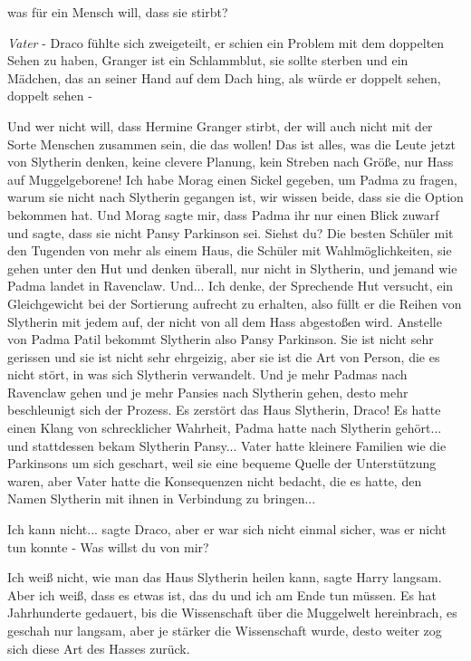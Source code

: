 \glqq was für ein Mensch will, dass sie stirbt?\grqq{}

\emph{Vater} - Draco fühlte sich zweigeteilt, er schien ein Problem mit dem
doppelten Sehen zu haben, Granger ist ein Schlammblut, sie sollte sterben und
ein Mädchen, das an seiner Hand auf dem Dach hing, als würde er doppelt sehen,
doppelt sehen -

\glqq Und wer nicht will, dass Hermine Granger stirbt, der will auch nicht mit
der Sorte Menschen zusammen sein, die das wollen! Das ist alles, was die Leute
jetzt von Slytherin denken, keine clevere Planung, kein Streben nach Größe, nur
Hass auf Muggelgeborene! Ich habe Morag einen Sickel gegeben, um Padma zu
fragen, warum sie nicht nach Slytherin gegangen ist, wir wissen beide, dass sie
die Option bekommen hat. Und Morag sagte mir, dass Padma ihr nur einen Blick
zuwarf und sagte, dass sie nicht Pansy Parkinson sei. Siehst du? Die besten
Schüler mit den Tugenden von mehr als einem Haus, die Schüler mit
Wahlmöglichkeiten, sie gehen unter den Hut und denken überall, nur nicht in
Slytherin, und jemand wie Padma landet in Ravenclaw. Und... Ich denke, der
Sprechende Hut versucht, ein Gleichgewicht bei der Sortierung aufrecht zu
erhalten, also füllt er die Reihen von Slytherin mit jedem auf, der nicht von
all dem Hass abgestoßen wird. Anstelle von Padma Patil bekommt Slytherin also
Pansy Parkinson. Sie ist nicht sehr gerissen und sie ist nicht sehr ehrgeizig,
aber sie ist die Art von Person, die es nicht stört, in was sich Slytherin
verwandelt. Und je mehr Padmas nach Ravenclaw gehen und je mehr Pansies nach
Slytherin gehen, desto mehr beschleunigt sich der Prozess. Es zerstört das Haus
Slytherin, Draco!\grqq{} Es hatte einen Klang von schrecklicher Wahrheit, Padma
hatte nach Slytherin gehört... und stattdessen bekam Slytherin Pansy... Vater
hatte kleinere Familien wie die Parkinsons um sich geschart, weil sie eine
bequeme Quelle der Unterstützung waren, aber Vater hatte die Konsequenzen nicht
bedacht, die es hatte, den Namen Slytherin mit ihnen in Verbindung zu bringen...

\glqq Ich kann nicht...\grqq{} sagte Draco, aber er war sich nicht einmal
sicher, was er nicht tun konnte - \glqq Was willst du von mir?\grqq{}

\glqq Ich weiß nicht, wie man das Haus Slytherin heilen kann\grqq{}, sagte Harry
langsam. \glqq Aber ich weiß, dass es etwas ist, das du und ich am Ende tun
müssen. Es hat Jahrhunderte gedauert, bis die Wissenschaft über die Muggelwelt
hereinbrach, es geschah nur langsam, aber je stärker die Wissenschaft wurde,
desto weiter zog sich diese Art des Hasses zurück.\grqq{}

